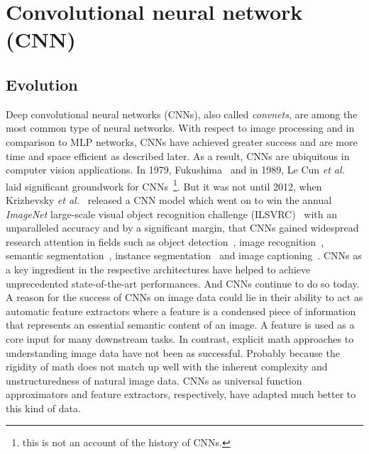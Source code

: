 \documentclass[a4paper,12pt]{report}
\begin{document}
\section{Convolutional neural network (CNN)}
\subsection{Evolution}
Deep convolutional neural networks (CNNs), also called \textit{convnets}, are among the most common type of neural networks. With respect to image processing and in comparison to MLP networks, CNNs have achieved greater success and are more time and space efficient as described later. As a result, CNNs are ubiquitous in computer vision applications. In 1979, Fukushima~\cite{FukushimaCnn79} and in 1989, Le Cun \textit{et al.}~\cite{CunGrounworkCNNs} laid significant groundwork for CNNs~\footnote{this is not an account of the history of CNNs.}. But it was not until 2012, when Krizhevsky \textit{et al.}~\cite{AlexNet} released a CNN model which went on to win the annual \textit{ImageNet} large-scale visual object recognition challenge (ILSVRC)~\cite{Imagenet} with an unparalleled accuracy and by a significant margin, that CNNs gained widespread research attention in fields such as object detection~\cite{FasterRCNN}, image recognition~\cite{AlexNet,DenseNet}, semantic segmentation~\cite{DeepLabv3+}, instance segmentation~\cite{MaskScoringRCNN} and image captioning~\cite{ImageCaptioningSOTA}. CNNs as a key ingredient in the respective architectures have helped to achieve unprecedented state-of-the-art performances. And CNNs continue to do so today. A reason for the success of CNNs on image data could lie in their ability to act as automatic feature extractors where a feature is a condensed piece of information that represents an essential semantic content of an image. A feature is used as a core input for many downstream tasks. In contrast, explicit math approaches to understanding image data have not been as successful. Probably because the rigidity of math does not match up well with the inherent complexity and unstructuredness of natural image data. CNNs as universal function approximators and feature extractors, respectively, have adapted much better to this kind of data.
\end{document}
